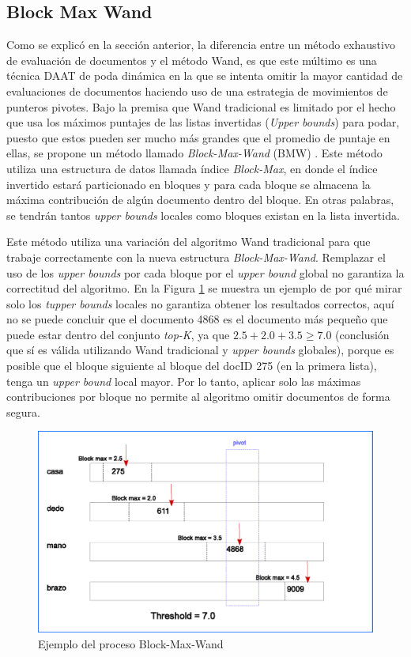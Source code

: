 \subsection{Block Max Wand}
\label{marco:bmw}
Como se explicó en la sección anterior, la diferencia entre un método exhaustivo de evaluación de documentos y el método Wand, es que este múltimo es una técnica DAAT de poda dinámica \citep{Moffat:1996} en la que se intenta omitir la mayor cantidad de evaluaciones de documentos haciendo uso de una estrategia de movimientos de punteros pivotes.
Bajo la premisa que Wand tradicional es limitado por el hecho que usa los máximos puntajes de las listas invertidas (\textit{Upper bounds}) para podar, puesto que estos pueden ser mucho más grandes que el promedio de puntaje en ellas, se propone un método llamado \textit{Block-Max-Wand} (BMW) \citep{Ding:2011}. Este método utiliza una estructura de datos llamada índice \textit{Block-Max}, en donde el índice invertido estará particionado en bloques y para cada bloque se almacena la máxima contribución de algún documento dentro del bloque. En otras palabras, se tendrán tantos \textit{upper bounds} locales como bloques existan en la lista invertida.

Este método utiliza una variación del algoritmo Wand tradicional para que trabaje correctamente con la nueva estructura \textit{Block-Max-Wand}. Remplazar el uso de los \textit{upper bounds} por cada bloque por el \textit{upper bound} global no garantiza la correctitud del algoritmo. En la Figura \ref{fig:bmw} se muestra un ejemplo de por qué mirar solo los \textit{tupper bounds} locales no garantiza obtener los resultados correctos, aquí no se puede concluir que el documento 4868 es el documento más pequeño que puede estar dentro del conjunto \textit{top-K}, ya que $2.5 + 2.0 + 3.5 \geq 7.0$ (conclusión que sí es válida utilizando Wand tradicional y \textit{upper bounds} globales), porque es posible que el bloque siguiente al bloque del docID 275 (en la primera lista), tenga un \textit{upper bound} local mayor. Por lo tanto, aplicar solo las máximas contribuciones por bloque no permite al algoritmo omitir documentos de forma segura.  

\begin{figure}[!th]
\centering
\includegraphics[scale=.75]{images/block-max-wand.eps}
\caption{Ejemplo del proceso Block-Max-Wand}
\label{fig:bmw}
\end{figure}


